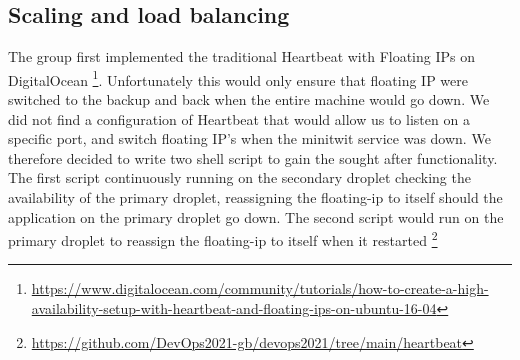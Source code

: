 \subsection{Scaling and load balancing}\label{subsection:scaling} %
The group first implemented the traditional Heartbeat with Floating IPs on DigitalOcean \footnote{\url{https://www.digitalocean.com/community/tutorials/how-to-create-a-high-availability-setup-with-heartbeat-and-floating-ips-on-ubuntu-16-04}}. Unfortunately this would only ensure that floating IP were switched to the backup and back when the entire machine would go down. We did not find a configuration of Heartbeat that would allow us to listen on a specific port, and switch floating IP's when the minitwit service was down. We therefore decided to write two shell script to gain the sought after functionality. The first script continuously running on the secondary droplet checking the availability of the primary droplet, reassigning the floating-ip to itself should the application on the primary droplet go down. The second script would run on the primary droplet to reassign the floating-ip to itself when it restarted \footnote{\url{https://github.com/DevOps2021-gb/devops2021/tree/main/heartbeat}}